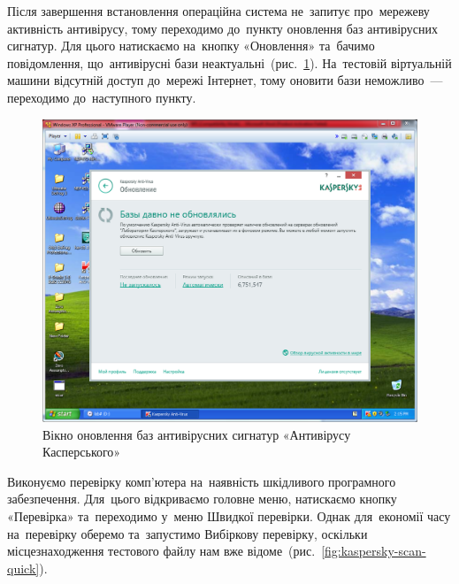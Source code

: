 \documentclass[
	a4paper,
	oneside,
	DIV = 12,
	fontsize = 13pt,
	headings = normal,
]{scrartcl}
\begin{document}
		Після завершення встановлення операційна система не~запитує про~мережеву активність антивірусу, тому переходимо до~пункту оновлення баз антивірусних сигнатур. Для цього натискаємо на~кнопку «Оновлення» та~бачимо повідомлення, що~антивірусні бази неактуальні~(рис.~\ref{fig:kaspersky-signatures-update}). На~тестовій віртуальній машини відсутній доступ до~мережі Інтернет, тому оновити бази неможливо~— переходимо до~наступного пункту.

		\begin{figure}[!htbp]
			\centering
			\includegraphics[height = 9\baselineskip]{./assets/y03s01-pcdiag-lab-05-p08.PNG}
			\caption{Вікно оновлення баз антивірусних сигнатур «Антивірусу Касперського»}
			\label{fig:kaspersky-signatures-update}
		\end{figure}

		Виконуємо перевірку комп'ютера на~наявність шкідливого програмного забезпечення. Для~цього відкриваємо головне меню, натискаємо кнопку «Перевірка» та~переходимо у~меню Швидкої перевірки. Однак для~економії часу на~перевірку оберемо та~запустимо Вибіркову перевірку, оскільки місцезнаходження тестового файлу нам вже відоме~(рис.~\ref{fig:kaspersky-scan-quick}).
\end{document}
